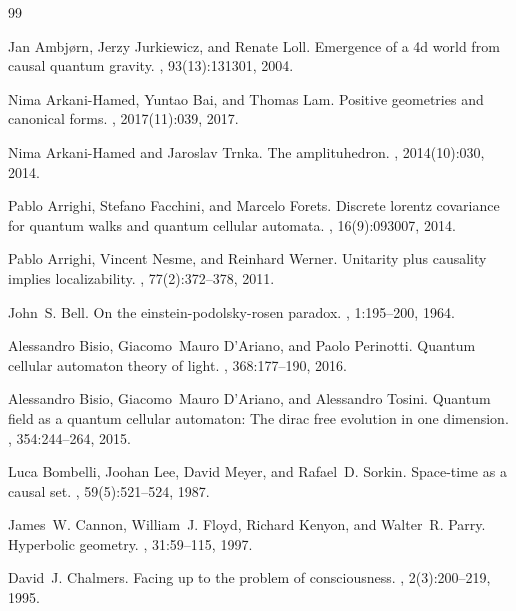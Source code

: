 \begingroup
\raggedbottom
\begin{thebibliography}{99}
\relax

Jan Ambj{\o}rn, Jerzy Jurkiewicz, and Renate Loll.
\newblock Emergence of a 4d world from causal quantum gravity.
, 93(13):131301, 2004.

Nima Arkani-Hamed, Yuntao Bai, and Thomas Lam.
\newblock Positive geometries and canonical forms.
, 2017(11):039, 2017.

Nima Arkani-Hamed and Jaroslav Trnka.
\newblock The amplituhedron.
, 2014(10):030, 2014.

Pablo Arrighi, Stefano Facchini, and Marcelo Forets.
\newblock Discrete lorentz covariance for quantum walks and quantum cellular
  automata.
, 16(9):093007, 2014.

Pablo Arrighi, Vincent Nesme, and Reinhard Werner.
\newblock Unitarity plus causality implies localizability.
, 77(2):372--378, 2011.

John~S. Bell.
\newblock On the einstein-podolsky-rosen paradox.
, 1:195--200, 1964.

Alessandro Bisio, Giacomo~Mauro D'Ariano, and Paolo Perinotti.
\newblock Quantum cellular automaton theory of light.
, 368:177--190, 2016.

Alessandro Bisio, Giacomo~Mauro D'Ariano, and Alessandro Tosini.
\newblock Quantum field as a quantum cellular automaton: The dirac free
  evolution in one dimension.
, 354:244--264, 2015.

Luca Bombelli, Joohan Lee, David Meyer, and Rafael~D. Sorkin.
\newblock Space-time as a causal set.
, 59(5):521--524, 1987.

James~W. Cannon, William~J. Floyd, Richard Kenyon, and Walter~R. Parry.
\newblock Hyperbolic geometry.
, 31:59--115, 1997.

David~J. Chalmers.
\newblock Facing up to the problem of consciousness.
, 2(3):200--219, 1995.


\end{thebibliography}
